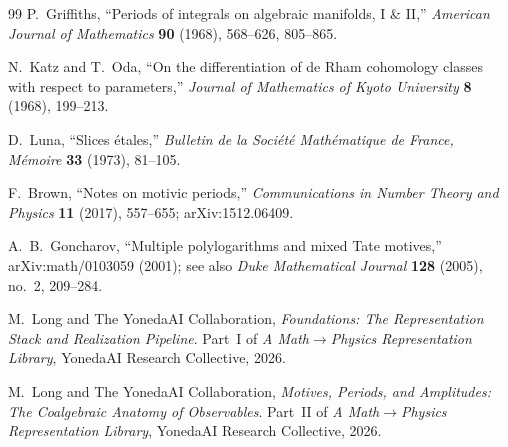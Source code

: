 \documentclass[12pt]{article}
\theoremstyle{definition}
\theoremstyle{remark}
\begin{document}
\begin{thebibliography}{99}
P.~Griffiths,
``Periods of integrals on algebraic manifolds, I \& II,''
\emph{American Journal of Mathematics} \textbf{90} (1968), 568--626, 805--865.

N.~Katz and T.~Oda,
``On the differentiation of de Rham cohomology classes with respect to parameters,''
\emph{Journal of Mathematics of Kyoto University} \textbf{8} (1968), 199--213.

D.~Luna,
``Slices \'etales,''
\emph{Bulletin de la Soci\'et\'e Math\'ematique de France, M\'emoire} \textbf{33} (1973), 81--105.

F.~Brown,
``Notes on motivic periods,''
\emph{Communications in Number Theory and Physics} \textbf{11} (2017), 557--655; arXiv:1512.06409.

A.~B.~Goncharov, ``Multiple polylogarithms and mixed Tate motives,'' arXiv:math/0103059 (2001);
see also \emph{Duke Mathematical Journal} \textbf{128} (2005), no.~2, 209--284.

M.~Long and The YonedaAI Collaboration,
\emph{Foundations: The Representation Stack and Realization Pipeline}.
Part~I of \emph{A Math$\to$Physics Representation Library}, YonedaAI Research Collective, 2026.

M.~Long and The YonedaAI Collaboration,
\emph{Motives, Periods, and Amplitudes: The Coalgebraic Anatomy of Observables}.
Part~II of \emph{A Math$\to$Physics Representation Library}, YonedaAI Research Collective, 2026.

\end{thebibliography}
\end{document}
